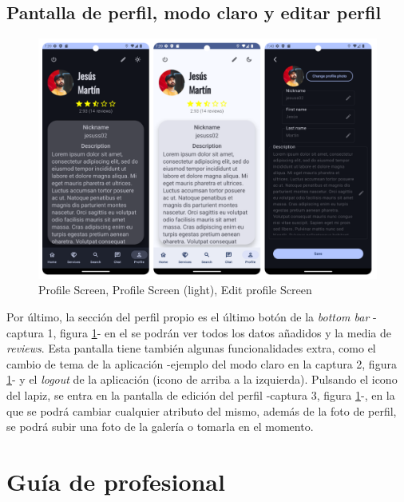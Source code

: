 \subsection{Pantalla de perfil, modo claro y editar perfil}
\begin{figure}[h]
	\centering
	\includegraphics[width = 1\textwidth]{Imagenes/capturasApp/profile_light_edit.png}
	\caption{Profile Screen, Profile Screen (light), Edit profile Screen}
	\label{fig:capApp5}
\end{figure}

Por último, la sección del perfil propio es el último botón de la \textit{bottom bar} -captura 1, figura \ref{fig:capApp5}- en el se podrán ver todos los datos añadidos y la media de \textit{reviews}. Esta pantalla tiene también algunas funcionalidades extra, como el cambio de tema de  la aplicación -ejemplo del modo claro en la captura 2, figura \ref{fig:capApp5}- y el \textit{logout} de la aplicación (icono de arriba a la izquierda). Pulsando el icono del lapiz, se entra en la pantalla de edición del perfil -captura 3, figura \ref{fig:capApp5}-, en la que se podrá cambiar cualquier atributo del mismo, además de la foto de perfil, se podrá subir una foto de la galería o tomarla en el momento.

\newpage
\section{Guía de profesional}
\label{sec:guiaProf}
